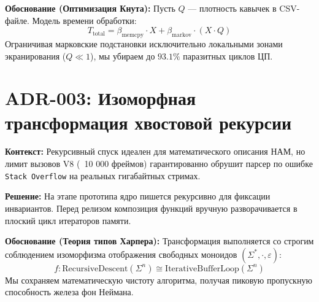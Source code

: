 \documentclass[12pt,a4paper]{article}
\begin{document}
\textbf{Обоснование (Оптимизация Кнута):}
Пусть $Q$ --- плотность кавычек в CSV-файле. Модель времени обработки:
\[T_{\text{total}} = \beta_{\text{memcpy}} \cdot X + \beta_{\text{markov}} \cdot (X \cdot Q)\]
Ограничивая марковские подстановки исключительно локальными зонами экранирования ($Q \ll 1$), мы убираем до $93.1\%$ паразитных циклов ЦП.

\section*{ADR-003: Изоморфная трансформация хвостовой рекурсии}
\textbf{Контекст:} Рекурсивный спуск идеален для математического описания НАМ, но лимит вызовов V8 (~10 000 фреймов) гарантированно обрушит парсер по ошибке \texttt{Stack Overflow} на реальных гигабайтных стримах.

\textbf{Решение:} На этапе прототипа ядро пишется рекурсивно для фиксации инвариантов. Перед релизом композиция функций вручную разворачивается в плоский цикл итераторов памяти.

\textbf{Обоснование (Теория типов Харпера):}
Трансформация выполняется со строгим соблюдением изоморфизма отображения свободных моноидов $(\Sigma^*, \cdot, \varepsilon)$:
\[f: \text{RecursiveDescent}(\Sigma^n) \cong \text{IterativeBufferLoop}(\Sigma^n)\]
Мы сохраняем математическую чистоту алгоритма, получая пиковую пропускную способность железа фон Неймана.
\end{document}
